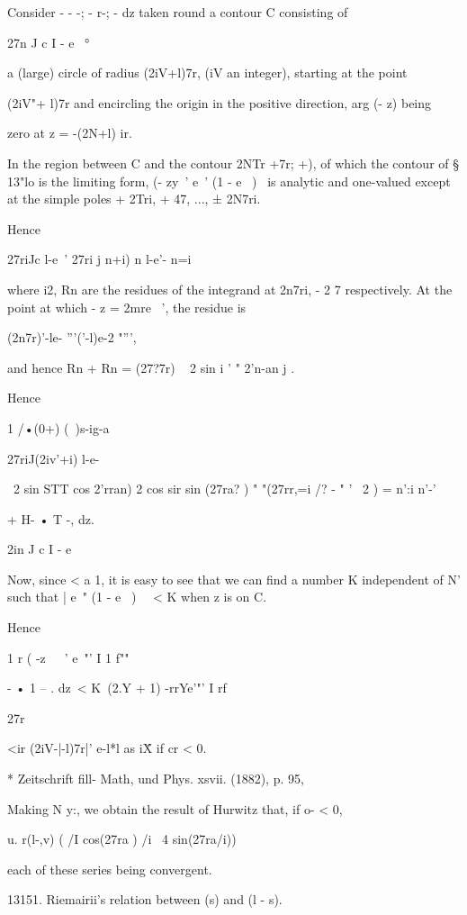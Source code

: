 Consider - - -; - r-; - dz taken round a contour C consisting of

27n J c I - e~ °

a (large) circle of radius (2iV+l)7r, (iV an integer), starting at the
point

(2iV"+ l)7r and encircling the origin in the positive direction, arg
(- z) being

zero at z = -(2N+l) ir.

In the region between C and the contour 2NTr +7r; +), of which the
contour of § 13"lo is the limiting form, (- zy~' e~' (1 - e~ )~ is
analytic and one-valued except at the simple poles + 2Tri, + 47, ...,
± 2N7ri.

Hence

27riJc l-e~' 27ri j n+i) n l-e'- n=i

where i2, Rn are the residues of the integrand at 2n7ri, - 2 7
respectively. At the point at which - z = 2mre~ ', the residue is

(2n7r)'-le- '''('-l)e-2 "''',

and hence Rn + Rn = (27?7r) ~ 2 sin i ' " 2'n-an j .

Hence

1 /•(0+) (\ )s-ig-a

27riJ(2iv'+i) l-e-

\ 2 sin STT cos 2'rran) 2 cos sir sin (27ra? ) " "(27rr,=i /? - " ' \
2 ) = n':i n'-'

+ H- • T -, dz.

2in J c I - e

Now, since < a 1, it is easy to see that we can find a number K
independent of N' such that | e~" (1 - e~ )~ \ < K when z is on C.

Hence

1 r ( -z\ \ ~' e~"' I 1 f""

- • 1 -- . dz\ < K\, (2.Y + 1) -rrYe'"' I rf

27r

<ir (2iV-|-l)7r|' e-l*l as i\" X if cr < 0.

* Zeitschrift fill- Math, und Phys. xsvii. (1882), p. 95,

%
%

Making N y:, we obtain the result of Hurwitz that, if o- < 0,

 u. r(l-,v) ( /I cos(27ra ) /i \ 4 sin(27ra/i))

each of these series being convergent.

13151. Riemairii's relation between (s) and (l - s).

